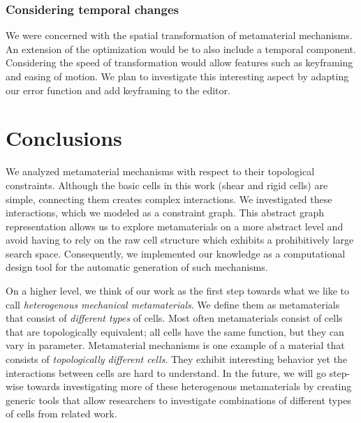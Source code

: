 \subsubsection{Considering temporal changes}
We were concerned with the spatial transformation of metamaterial mechanisms. An extension of the optimization would be to also include a temporal component. Considering the speed of transformation would allow features such as keyframing and easing of motion. We plan to investigate this interesting aspect by adapting our error function and add keyframing to the editor.


\section{Conclusions}

We analyzed metamaterial mechanisms with respect to their topological constraints. Although the basic cells in this work (shear and rigid cells) are simple, connecting them creates complex interactions. We investigated these interactions, which we modeled as a constraint graph. This abstract graph representation allows us to explore metamaterials on a more abstract level and avoid having to rely on the raw cell structure which exhibits a prohibitively large search space. Consequently, we implemented our knowledge as a computational design tool for the automatic generation of such mechanisms. 

On a higher level, we think of our work as the first step towards what we like to call \textit{heterogenous mechanical metamaterials}. We define them as metamaterials that consist of \textit{different types} of cells. Most often metamaterials consist of cells that are topologically equivalent; all cells have the same function, but they can vary in parameter. Metamaterial mechanisms is one example of a material that consists of \textit{topologically different cells}. They exhibit interesting behavior yet the interactions between cells are hard to understand. In the future, we will go step-wise towards investigating more of these heterogenous metamaterials by creating generic tools that allow researchers to investigate combinations of different types of cells from related work. 






